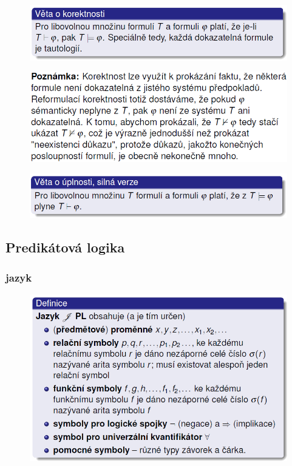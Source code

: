 \documentclass[10pt,a4paper]{article}
\theoremstyle{note}
\begin{document}
			\begin{figure}[H]
			\centering
			\includegraphics[width=13cm]{img/VoK.png}
			\end{figure}

			\begin{figure}[H]
			\centering
			\includegraphics[width=13cm]{img/VoKpoznamka.png}
			\end{figure}

			\begin{figure}[H]
			\centering
			\includegraphics[width=13cm]{img/VoU.png}
			\end{figure}

	\subsection{Predikátová logika}

		\subsubsection{jazyk}

			\begin{figure}[H]
			\centering
			\includegraphics[width=13cm]{img/JazykPL.png}
			\end{figure}
\end{document}
